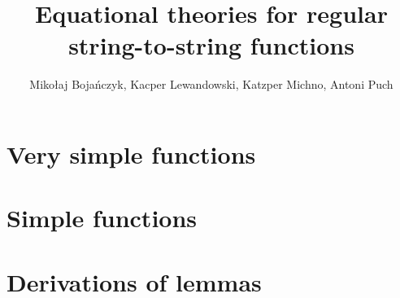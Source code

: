 \documentclass{article}
\begin{document}
\title{Equational theories for regular string-to-string functions}
\author{Miko{\l}aj Boja\'nczyk, Kacper Lewandowski, Katzper Michno, Antoni Puch}

\maketitle

\listoftodos

\tableofcontents

\section{Very simple functions}


\section{Simple functions}


\printbibliography

\appendix

\section{Derivations of lemmas}\label{sec:proofs-of-lemmas}

\end{document}

